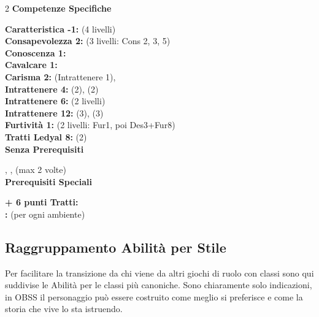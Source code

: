 \begin{multicols}{2}
	\textbf{Competenze Specifiche}

	\textbf{Caratteristica -1:}  (4 livelli)\\
	\textbf{Consapevolezza 2:}  (3 livelli: Cons 2, 3, 5)\\
	\textbf{Conoscenza 1:} \\
	\textbf{Cavalcare 1:} \\
	\textbf{Carisma 2:}  (Intrattenere 1), \\
	\textbf{Intrattenere 4:}  (2),  (2)\\
	\textbf{Intrattenere 6:}  (2 livelli)\\
	\textbf{Intrattenere 12:}  (3),  (3)\\
	\textbf{Furtività 1:}  (2 livelli: Fur1, poi Des3+Fur8)\\
	\textbf{Tratti Ledyal 8:}  (2)\\

	\textbf{Senza Prerequisiti}

	, ,  (max 2 volte)\\

	\textbf{Prerequisiti Speciali}

	\textbf{ + 6 punti Tratti:} \\
	\textbf{:}  (per ogni ambiente)\\


\end{multicols}

\pagebreak

\subsection{Raggruppamento Abilità per Stile}

Per facilitare la transizione da chi viene da altri giochi di ruolo con classi sono qui suddivise le Abilità per le classi più canoniche. Sono chiaramente solo indicazioni, in OBSS il personaggio può essere costruito come meglio si preferisce e come la storia che vive lo sta istruendo.

